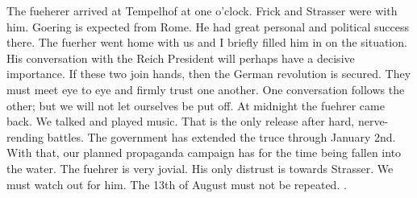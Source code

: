 
The fueherer arrived at Tempelhof at one o'clock. Frick and Strasser were with him. Goering is expected from Rome. He had great personal and political success there. The fuerher went home with us and I briefly filled him in on the situation. His conversation with the Reich President will perhaps have a decisive importance. If these two join hands, then the German revolution is secured. They must meet eye to eye and firmly trust one another. One conversation follows the other; but we will not let ourselves be put off. At midnight the fuehrer came back. We talked and played music. That is the only release after hard, nerve-rending battles. The government has extended the truce through January 2nd. With that, our planned propaganda campaign has for the time being fallen into the water. The fuehrer is very jovial. His only distrust is towards Strasser. We must watch out for him. The 13th of August must not be repeated. .

%